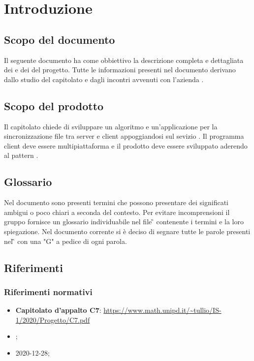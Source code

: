 \section{Introduzione}
\subsection{Scopo del documento}
Il seguente documento ha come obbiettivo la descrizione completa e dettagliata dei  e dei  del progetto. Tutte le informazioni presenti nel documento derivano dallo studio del capitolato e dagli incontri avvenuti con l'azienda .

\subsection{Scopo del prodotto}
Il capitolato chiede di sviluppare un algoritmo e un'applicazione per la sincronizzazione file tra server e client appoggiandosi sul sevizio .
Il programma client deve essere multipiattaforma e il prodotto deve essere sviluppato aderendo al pattern .

\subsection{Glossario}
Nel documento sono presenti termini che possono presentare dei significati ambigui o poco chiari a seconda del contesto.
Per evitare incomprensioni il gruppo fornisce un glossario individuabile nel file \G{} \versGlo{} contenente i termini e la loro spiegazione.\newline{}
Nel documento corrente si è deciso di segnare tutte le parole presenti nel \G{} con una "G" a pedice di ogni parola.

\subsection{Riferimenti}
\subsubsection{Riferimenti normativi}
\begin{itemize}
\item \textbf{Capitolato d'appalto C7}:\newline
      \url{https://www.math.unipd.it/~tullio/IS-1/2020/Progetto/C7.pdf}
\item \NdP{} \versNdP ;
\item \VE{} 2020-12-28; %
\end{itemize}


